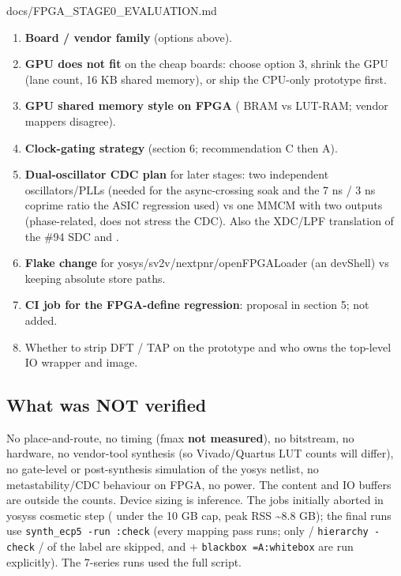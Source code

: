 \begin{relocated}{docs/FPGA_STAGE0_EVALUATION.md}
\begin{enumerate}
\def\labelenumi{\arabic{enumi}.}
\tightlist
\item
  \textbf{Board / vendor family} (options above).
\item
  \textbf{GPU does not fit} on the cheap boards: choose option 3, shrink
  the GPU (lane count, 16 KB shared memory), or ship the CPU-only
  prototype first.
\item
  \textbf{GPU shared memory style on FPGA} ( BRAM vs
  LUT-RAM; vendor mappers disagree).
\item
  \textbf{Clock-gating strategy} (section 6; recommendation C then A).
\item
  \textbf{Dual-oscillator CDC plan} for later stages: two independent
  oscillators/\allowbreak{}PLLs (needed for the async-crossing soak and
  the 7 ns / 3 ns coprime ratio the ASIC regression used) vs one MMCM
  with two outputs (phase-related, does not stress the CDC). Also the
  XDC/LPF translation of the \#94 SDC and .
\item
  \textbf{Flake change} for
  yosys/\allowbreak{}sv2v/\allowbreak{}nextpnr/\allowbreak{}openFPGALoader
  (an  devShell) vs keeping absolute store paths.
\item
  \textbf{CI job for the FPGA-define regression}: proposal in section 5;
  not added.
\item
  Whether to strip DFT / TAP on the prototype and who owns the top-level
  IO wrapper and  image.
\end{enumerate}

\subsection{What was NOT verified}\label{tm:dec:fpga-stage0-evaluation:10-what-was-not-verified}

No place-and-route, no timing (fmax \textbf{not measured}), no
bitstream, no hardware, no vendor-tool synthesis (so
Vivado/\allowbreak{}Quartus LUT counts will differ), no gate-level or
post-synthesis simulation of the yosys netlist, no
metastability/\allowbreak{}CDC behaviour on FPGA, no power. The
 content and IO buffers are outside the counts. Device
sizing is inference. The  jobs initially aborted in
yosys\textquotesingle s cosmetic  step
( under the 10 GB cap, peak RSS \textasciitilde8.8
GB); the final runs use
\texttt{synth\_\allowbreak{}ecp5\ -\allowbreak{}run\ :\allowbreak{}check}
(every mapping pass runs; only  /
\texttt{hierarchy\ -\allowbreak{}check} /  of the
 label are skipped, and  +
\texttt{blackbox\ =\allowbreak{}A:\allowbreak{}whitebox} are run
explicitly). The 7-series runs used the full  script.
\end{relocated}

